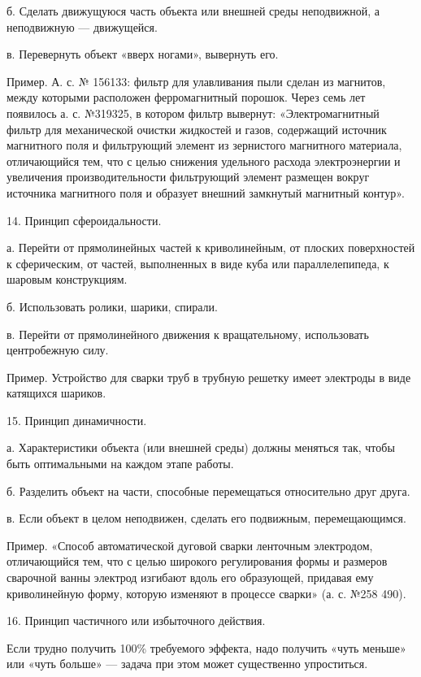 б. Сделать движущуюся  часть объекта или внешней  среды неподвижной, а
неподвижную — движущейся.

в. Перевернуть объект «вверх ногами», вывернуть его.

Пример.  А.  с.  №  156133:  фильтр для  улавливания  пыли  сделан  из
магнитов,  между  которыми  расположен ферромагнитный  порошок.  Через
семь  лет  появилось  а.  с.   №319325,  в  котором  фильтр  вывернут:
«Электромагнитный   фильтр  для   механической  очистки   жидкостей  и
газов,  содержащий  источник  магнитного поля  и  фильтрующий  элемент
из   зернистого  магнитного   материала,  отличающийся   тем,  что   с
целью   снижения  удельного   расхода   электроэнергии  и   увеличения
производительности  фильтрующий  элемент   размещен  вокруг  источника
магнитного поля и образует внешний замкнутый магнитный контур».

14. Принцип сфероидальности.

а.  Перейти  от  прямолинейных  частей  к  криволинейным,  от  плоских
поверхностей к  сферическим, от  частей, выполненных  в виде  куба или
параллелепипеда, к шаровым конструкциям.

б. Использовать ролики, шарики, спирали.

в. Перейти  от прямолинейного  движения к  вращательному, использовать
центробежную силу.

Пример. Устройство для сварки труб в трубную решетку имеет электроды в
виде катящихся шариков.

15. Принцип динамичности.

а.  Характеристики объекта  (или внешней  среды) должны  меняться так,
чтобы быть оптимальными на каждом этапе работы.

б. Разделить объект на части, способные перемещаться относительно друг
друга.

в.   Если  объект   в   целом  неподвижен,   сделать  его   подвижным,
перемещающимся.

Пример.  «Способ автоматической  дуговой сварки  ленточным электродом,
отличающийся тем, что с целью  широкого регулирования формы и размеров
сварочной ванны  электрод изгибают вдоль его  образующей, придавая ему
криволинейную форму, которую  изменяют в процессе сварки»  (а. с. №258
490).

16. Принцип частичного или избыточного действия.

Если  трудно получить  100\%  требуемого эффекта,  надо получить  «чуть
меньше»  или  «чуть  больше»  —  задача  при  этом  может  существенно
упроститься.

